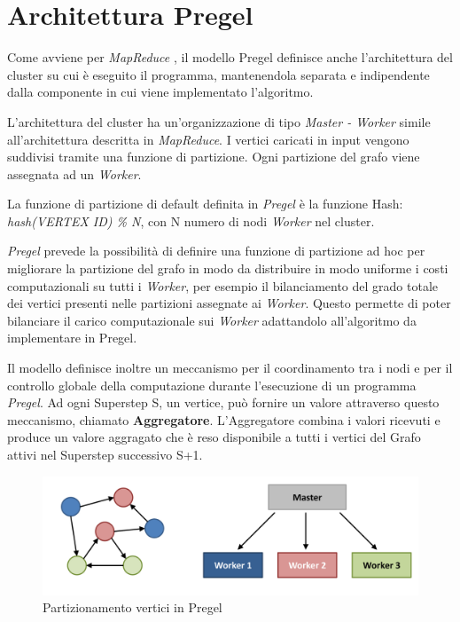 \documentclass[LaM,binding=0.6cm]{sapthesis}
\begin{document}
\section{Architettura Pregel}

Come avviene per \textit{MapReduce} \cite{Dean:2008:MSD:1327452.1327492}, il modello Pregel definisce anche l'architettura del cluster su cui è eseguito il programma, mantenendola separata e indipendente dalla componente in cui viene implementato l'algoritmo.

L’architettura del cluster ha un'organizzazione di tipo \textit{Master - Worker} simile all'architettura descritta in \textit{MapReduce}.
I vertici caricati in input vengono suddivisi tramite una funzione di partizione. Ogni partizione del grafo viene assegnata ad un \textit{Worker}. 

La funzione di partizione di default definita in \textit{Pregel} è la funzione Hash:
\textit{hash(VERTEX ID) \% N}, con N numero di nodi \textit{Worker} nel cluster.

\textit{Pregel} prevede la possibilità di definire una funzione di partizione ad hoc per migliorare la partizione del grafo in modo da distribuire in modo uniforme i costi computazionali su tutti i \textit{Worker}, per esempio il bilanciamento del grado totale dei vertici presenti nelle partizioni assegnate ai \textit{Worker}. Questo permette di poter bilanciare il carico computazionale sui \textit{Worker} adattandolo all'algoritmo da implementare in Pregel.

Il modello definisce inoltre un meccanismo per il coordinamento tra i nodi e per il controllo globale della computazione durante l'esecuzione di un programma \textit{Pregel}. Ad ogni Superstep S, un vertice, può fornire un valore attraverso questo meccanismo, chiamato \textbf{Aggregatore}. L'Aggregatore combina i valori ricevuti e produce un valore aggragato che è reso disponibile a tutti i vertici del Grafo attivi nel Superstep successivo S+1.


\begin{figure}[b]
\centering
\includegraphics[width=1\textwidth]{partizionePregel}
\caption{Partizionamento vertici in Pregel}
\label{fig:partizPregel}
\end{figure}
\end{document}
